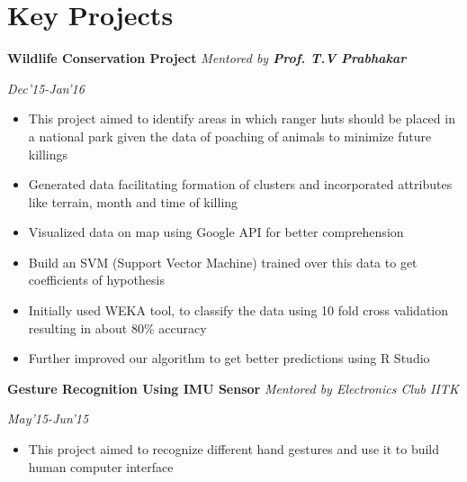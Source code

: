 \documentclass[14pt]{article} %
\begin{document}
\section*{Key Projects}

\begin{itemize}
\begin{minipage}{0.78 \textwidth}
\item{\bfseries Wildlife Conservation Project} \textit{{Mentored by \bfseries{Prof. T.V Prabhakar}}}
\end{minipage}
 \begin{minipage}{0.14 \textwidth}
\textit{Dec'15-Jan'16} 
\end{minipage} 
\begin{itemize}
\item This project aimed to identify areas in which ranger huts should be placed in a national park given the data of poaching of animals to minimize future killings
\vspace{-4pt}
\item Generated data facilitating formation of clusters and incorporated attributes like terrain, month and time of killing 
\vspace{-4pt}
\item Visualized data on map using Google API for better comprehension  
\vspace{-4pt}
\item Build an SVM (Support Vector Machine) trained over this data to get coefficients of hypothesis
\vspace{-4pt}
\item Initially used WEKA tool, to classify the data using 10 fold cross validation resulting in about 80\% accuracy
\vspace{-4pt}
\item Further improved our algorithm to get better predictions using R Studio
\vspace{-4pt}
\end{itemize}
\begin{minipage}{0.78 \textwidth}
\item{\bfseries Gesture Recognition Using IMU Sensor} \textit{Mentored by Electronics Club IITK}       
\end{minipage}
 \begin{minipage}{0.14 \textwidth}
\textit{May'15-Jun'15}
\end{minipage} 
\vspace{-4pt}
\begin{itemize}
\item This project aimed to recognize different hand gestures and use it to build human computer interface 

\end{itemize}
\end{itemize}
\end{document}
